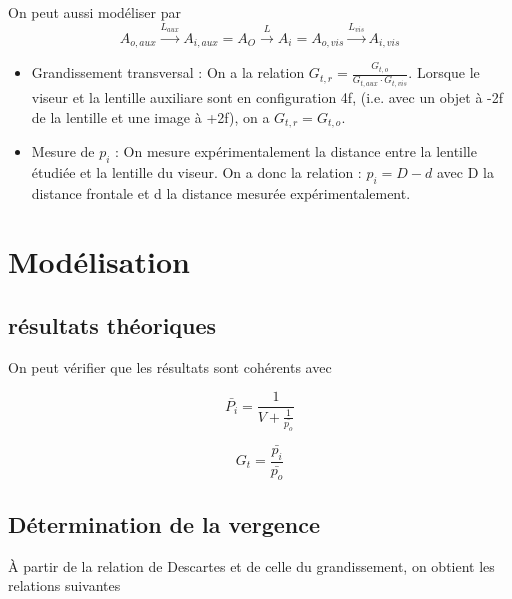 \documentclass[french]{yLectureNote}
\begin{document}
On peut aussi modéliser par \[A_{o, aux} \xrightarrow{L_{aux}} A_{i, aux} = A_{O}\xrightarrow{L} A_{i} = A_{o, vis}\xrightarrow{L_{vis}} A_{i,vis}\]
\begin{itemize}
 \item Grandissement transversal : On a la relation \(G_{t, r} = \frac{G_{t, o}}{G_{t, aux}\cdot G_{t, vis}}\). Lorsque le viseur et la lentille auxiliare sont en configuration 4f, (i.e. avec un objet à -2f de la lentille et une image à +2f), on a \(G_{t, r} = G_{t, o}\).
 \item Mesure de \(p_i\) : On mesure expérimentalement la distance entre la lentille étudiée et la lentille du viseur. On a donc la relation : \(p_i = D-d\) avec D la distance frontale et d la distance mesurée expérimentalement.
\end{itemize}

\section{Modélisation}
\subsection{résultats théoriques}
On peut vérifier que les résultats sont cohérents avec
\begin{theorem}[Valeur de \(p_i\)]
\[\bar{P_i}   = \frac{1}{V+\frac{1}{\bar{p_o}}}\]
\end{theorem}
\begin{theorem}
\[G_t = \frac{\bar{p_i}}{\bar{p_o}}\]
\end{theorem}
\subsection{Détermination de la vergence}
À partir de la relation de Descartes et de celle du grandissement, on obtient les relations suivantes
\end{document}
